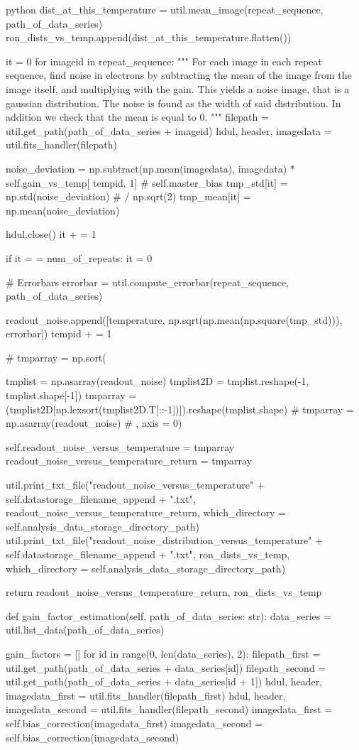 \documentclass[../main.tex]{subfiles}
\begin{document}
\begin{mintedbox}{python}
dist_at_this_temperature  =  util.mean_image(repeat_sequence, path_of_data_series)
ron_dists_vs_temp.append(dist_at_this_temperature.flatten())

it  =  0
for imageid in repeat_sequence:
"""
For each image in each repeat sequence, find noise in electrons 
by subtracting the mean of the image from the image itself, and 
multiplying with the gain. This yields a noise image, that is a 
gaussian distribution. The noise is found as the  width of said 
distribution. In addition we check that the mean is equal to 0.
"""
filepath  =  util.get_path(path_of_data_series + imageid)
hdul, header, imagedata  =  util.fits_handler(filepath)

noise_deviation  =  np.subtract(np.mean(imagedata), imagedata) * self.gain_vs_temp[
tempid, 1]  # self.master_bias
tmp_std[it]  =  np.std(noise_deviation)  # / np.sqrt(2)
tmp_mean[it]  =  np.mean(noise_deviation)

hdul.close()
it + =  1

if it  =  =  num_of_repeats:
it  =  0

# Errorbars
errorbar  =  util.compute_errorbar(repeat_sequence, path_of_data_series)

readout_noise.append([temperature, np.sqrt(np.mean(np.square(tmp_std))), errorbar])
tempid + =  1

# tmparray  =  np.sort(

tmplist  =  np.asarray(readout_noise)
tmplist2D  =  tmplist.reshape(-1, tmplist.shape[-1])
tmparray  =  (tmplist2D[np.lexsort(tmplist2D.T[::-1])]).reshape(tmplist.shape)
# tmparray = np.asarray(readout_noise)
# , axis = 0)

self.readout_noise_versus_temperature  =  tmparray
readout_noise_versus_temperature_return  =  tmparray

util.print_txt_file("readout_noise_versus_temperature" + self.datastorage_filename_append + ".txt",
readout_noise_versus_temperature_return,
which_directory = self.analysis_data_storage_directory_path)
util.print_txt_file("readout_noise_distribution_versus_temperature" + self.datastorage_filename_append + ".txt",
ron_dists_vs_temp,
which_directory = self.analysis_data_storage_directory_path)

return readout_noise_versus_temperature_return, ron_dists_vs_temp

def gain_factor_estimation(self, path_of_data_series: str):
data_series  =  util.list_data(path_of_data_series)

gain_factors  =  []
for id in range(0, len(data_series), 2):
filepath_first  =  util.get_path(path_of_data_series + data_series[id])
filepath_second  =  util.get_path(path_of_data_series + data_series[id + 1])
hdul, header, imagedata_first  =  util.fits_handler(filepath_first)
hdul, header, imagedata_second  =  util.fits_handler(filepath_second)
imagedata_first  =  self.bias_correction(imagedata_first)
imagedata_second  =  self.bias_correction(imagedata_second)


\end{mintedbox}
\end{document}
